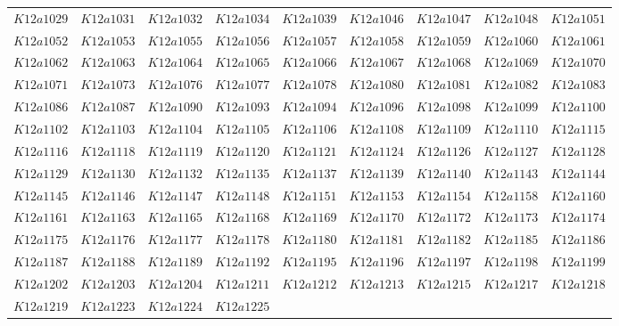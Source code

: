 \documentclass{amsart} %
\theoremstyle{thm}
\theoremstyle{definition}
\numberwithin{equation}{section}
\begin{document}
{\begin{longtable}{@{}lllllllll@{}}
  $K12a1029$ &  
  $K12a1031$ &  
  $K12a1032$ &  
  $K12a1034$ &  
  $K12a1039$ &  
  $K12a1046$ &  
  $K12a1047$ &  
  $K12a1048$ &  
  $K12a1051$ \\   
  $K12a1052$ &  
  $K12a1053$ &  
  $K12a1055$ &  
  $K12a1056$ &  
  $K12a1057$ &  
  $K12a1058$ &  
  $K12a1059$ &  
  $K12a1060$ &  
  $K12a1061$ \\   
  $K12a1062$ &  
  $K12a1063$ &  
  $K12a1064$ &  
  $K12a1065$ &  
  $K12a1066$ &  
  $K12a1067$ &  
  $K12a1068$ &  
  $K12a1069$ &  
  $K12a1070$ \\   
  $K12a1071$ &  
  $K12a1073$ &  
  $K12a1076$ &  
  $K12a1077$ &  
  $K12a1078$ &  
  $K12a1080$ &  
  $K12a1081$ &  
  $K12a1082$ &  
  $K12a1083$ \\   
  $K12a1086$ &  
  $K12a1087$ &  
  $K12a1090$ &  
  $K12a1093$ &  
  $K12a1094$ &  
  $K12a1096$ &  
  $K12a1098$ &  
  $K12a1099$ &  
  $K12a1100$ \\   
  $K12a1102$ &  
  $K12a1103$ &  
  $K12a1104$ &  
  $K12a1105$ &  
  $K12a1106$ &  
  $K12a1108$ &  
  $K12a1109$ &  
  $K12a1110$ &  
  $K12a1115$ \\   
  $K12a1116$ &  
  $K12a1118$ &  
  $K12a1119$ &  
  $K12a1120$ &  
  $K12a1121$ &  
  $K12a1124$ &  
  $K12a1126$ &  
  $K12a1127$ &  
  $K12a1128$ \\   
  $K12a1129$ &  
  $K12a1130$ &  
  $K12a1132$ &  
  $K12a1135$ &  
  $K12a1137$ &  
  $K12a1139$ &  
  $K12a1140$ &  
  $K12a1143$ &  
  $K12a1144$ \\   
  $K12a1145$ &  
  $K12a1146$ &  
  $K12a1147$ &  
  $K12a1148$ &  
  $K12a1151$ &  
  $K12a1153$ &  
  $K12a1154$ &  
  $K12a1158$ &  
  $K12a1160$ \\   
  $K12a1161$ &  
  $K12a1163$ &  
  $K12a1165$ &  
  $K12a1168$ &  
  $K12a1169$ &  
  $K12a1170$ &  
  $K12a1172$ &  
  $K12a1173$ &  
  $K12a1174$ \\   
  $K12a1175$ &  
  $K12a1176$ &  
  $K12a1177$ &  
  $K12a1178$ &  
  $K12a1180$ &  
  $K12a1181$ &  
  $K12a1182$ &  
  $K12a1185$ &  
  $K12a1186$ \\   
  $K12a1187$ &  
  $K12a1188$ &  
  $K12a1189$ &  
  $K12a1192$ &  
  $K12a1195$ &  
  $K12a1196$ &  
  $K12a1197$ &  
  $K12a1198$ &  
  $K12a1199$ \\   
  $K12a1202$ &  
  $K12a1203$ &  
  $K12a1204$ &  
  $K12a1211$ &  
  $K12a1212$ &  
  $K12a1213$ &  
  $K12a1215$ &  
  $K12a1217$ &  
  $K12a1218$ \\   
  $K12a1219$ &  
  $K12a1223$ &  
  $K12a1224$ &  
  $K12a1225$ &  

\end{longtable}}
\end{document}
